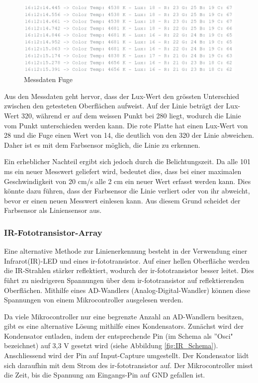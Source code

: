 \documentclass[../main.tex]{subfiles}
\begin{document}
\begin{figure}[H]
    \centering
    \includegraphics[width=\textwidth]{img/sensortest/MD_Fuge_101ms.png}
    \caption{Messdaten Fuge}
    \label{fig:MDFarbsensorFuge}
\end{figure}

Aus den Messdaten geht hervor, dass der Lux-Wert den grössten Unterschied zwischen den getesteten Oberflächen aufweist. Auf der Linie beträgt der Lux-Wert 320, während er auf dem weissen Punkt bei 280 liegt, wodurch die Linie vom Punkt unterschieden werden kann. Die rote Platte hat einen Lux-Wert von 28 und die Fuge einen Wert von 14, die deutlich von den 320 der Linie abweichen. Daher ist es mit dem Farbsensor möglich, die Linie zu erkennen.

Ein erheblicher Nachteil ergibt sich jedoch durch die Belichtungszeit. Da alle 101 ms ein neuer Messwert geliefert wird, bedeutet dies, dass bei einer maximalen Geschwindigkeit von 20 cm/s alle 2 cm ein neuer Wert erfasst werden kann. Dies könnte dazu führen, dass der Farbsensor die Linie verliert oder von ihr abweicht, bevor er einen neuen Messwert einlesen kann. Aus diesem Grund scheidet der Farbsensor als Liniensensor aus.

\newpage
\subsubsection{IR-Fototransistor-Array}
\label{a4:Infrarotfototransistor-Array}
Eine alternative Methode zur Linienerkennung besteht in der Verwendung einer Infrarot(IR)-LED und eines \gls{ir-fototransistor}. Auf einer hellen Oberfläche werden die IR-Strahlen stärker reflektiert, wodurch der \gls{ir-fototransistor} besser leitet. Dies führt zu niedrigeren Spannungen über dem \gls{ir-fototransistor} auf reflektierenden Oberflächen. Mithilfe eines AD-Wandlers (Analog-Digital-Wandler) können diese Spannungen von einem Mikrocontroller ausgelesen werden.

Da viele Mikrocontroller nur eine begrenzte Anzahl an AD-Wandlern besitzen, gibt es eine alternative Lösung mithilfe eines Kondensators. Zunächst wird der Kondensator entladen, indem der entsprechende Pin (im Schema als ''Osci" bezeichnet) auf 3,3 V gesetzt wird (siehe Abbildung \ref{fig:IR_Schema}). Anschliessend wird der Pin auf Input-Capture umgestellt. Der Kondensator lädt sich daraufhin mit dem Strom des \gls{ir-fototransistor} auf. Der Mikrocontroller misst die Zeit, bis die Spannung am Eingangs-Pin auf GND gefallen ist.
\end{document}

